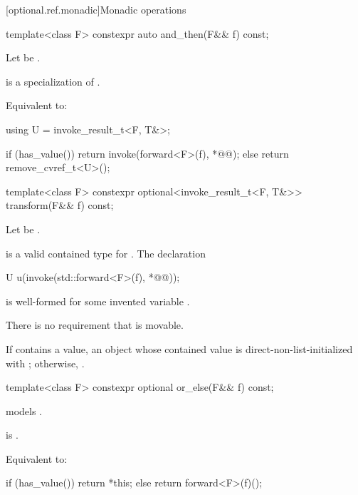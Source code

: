 [optional.ref.monadic]{Monadic operations}

%
\begin{itemdecl}
template<class F>
  constexpr auto and_then(F&& f) const;
\end{itemdecl}

\begin{itemdescr}
\pnum
Let  be .

\pnum
\mandates
{} is a specialization of .

\pnum
\effects
Equivalent to:
\begin{codeblock}
using U = invoke_result_t<F, T&>;

if (has_value()) {
  return invoke(forward<F>(f), *@@);
} else {
  return remove_cvref_t<U>();
}
\end{codeblock}
\end{itemdescr}

%
\begin{itemdecl}
template<class F>
  constexpr optional<invoke_result_t<F, T&>> transform(F&& f) const;
\end{itemdecl}

\begin{itemdescr}
\pnum
Let  be .

\pnum
\mandates
{} is a valid contained type for . The declaration
\begin{codeblock}
U u(invoke(std::forward<F>(f), *@@));
\end{codeblock}
is well-formed for some invented variable .
\begin{note}
There is no requirement that  is movable.
\end{note}

\pnum
\returns
If  contains a value, an  object whose contained value is direct-non-list-initialized with ; otherwise, .
\end{itemdescr}

%
\begin{itemdecl}
template<class F>
  constexpr optional or_else(F&& f) const;
\end{itemdecl}

\begin{itemdescr}
\pnum
\constraints
{} models .

\pnum
\mandates
{} is .

\pnum
\effects
Equivalent to:
\begin{codeblock}
if (has_value()) {
  return *this;
} else {
  return forward<F>(f)();
}
\end{codeblock}
\end{itemdescr}
